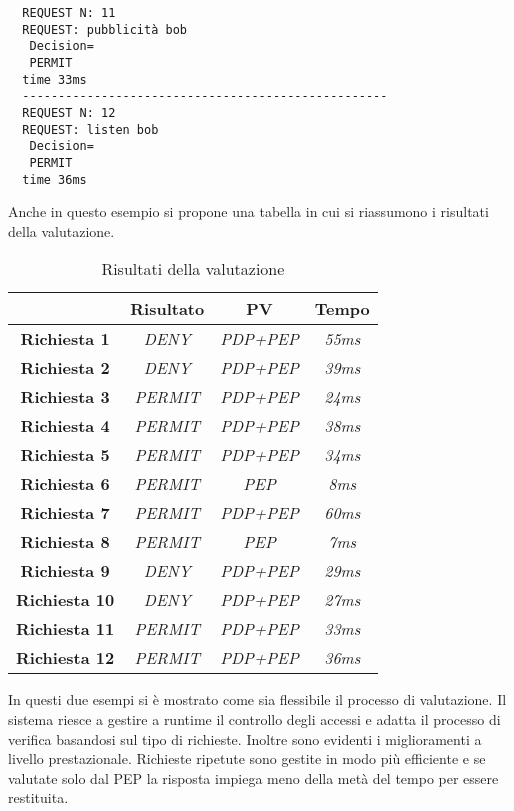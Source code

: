 \begin{verbatim}
  REQUEST N: 11
  REQUEST: pubblicità bob
   Decision=
   PERMIT
  time 33ms
  ---------------------------------------------------
  REQUEST N: 12
  REQUEST: listen bob
   Decision=
   PERMIT
  time 36ms
\end{verbatim}
Anche in questo esempio si propone una tabella in cui si riassumono i risultati della valutazione.
\begin{table}[h]
\centering
\footnotesize
\caption{Risultati della valutazione}
\label{tab:risultati_2}
\begin{tabular}{cccc}
\multicolumn{1}{l}{}  & \textbf{Risultato}  & \textbf{PV}       & \textbf{Tempo}  \\ \hline
\textbf{Richiesta 1}  & \textit{DENY}       & \textit{PDP+PEP}  & \textit{55ms}   \\ \hline
\textbf{Richiesta 2}  & \textit{DENY}       & \textit{PDP+PEP}  & \textit{39ms}   \\ \hline
\textbf{Richiesta 3}  & \textit{PERMIT}     & \textit{PDP+PEP}  & \textit{24ms}   \\ \hline
\textbf{Richiesta 4}  & \textit{PERMIT}     & \textit{PDP+PEP}  & \textit{38ms}   \\ \hline
\textbf{Richiesta 5}  & \textit{PERMIT}     & \textit{PDP+PEP}  & \textit{34ms}   \\ \hline
\textbf{Richiesta 6}  & \textit{PERMIT}     & \textit{PEP}      & \textit{8ms}    \\ \hline
\textbf{Richiesta 7}  & \textit{PERMIT}     & \textit{PDP+PEP}  & \textit{60ms}   \\ \hline
\textbf{Richiesta 8}  & \textit{PERMIT}     & \textit{PEP}      & \textit{7ms}    \\ \hline
\textbf{Richiesta 9}  & \textit{DENY}       & \textit{PDP+PEP}  & \textit{29ms}   \\ \hline
\textbf{Richiesta 10} & \textit{DENY}       & \textit{PDP+PEP}  & \textit{27ms}   \\ \hline
\textbf{Richiesta 11} & \textit{PERMIT}     & \textit{PDP+PEP}  & \textit{33ms}   \\ \hline
\textbf{Richiesta 12} & \textit{PERMIT}     & \textit{PDP+PEP}  & \textit{36ms}   \\ \hline
\end{tabular}
\end{table}

In questi due esempi si è mostrato come sia flessibile il processo di valutazione. Il sistema
riesce a gestire a runtime il controllo degli accessi e adatta il processo di verifica basandosi sul
tipo di richieste. Inoltre sono evidenti i miglioramenti a livello prestazionale. Richieste ripetute
sono gestite in modo più efficiente e se valutate solo dal \ac{PEP} la risposta impiega meno della metà del tempo
per essere restituita.
